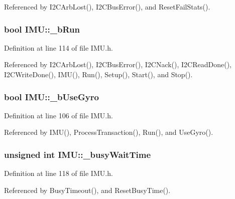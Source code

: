 Referenced by I2CArbLost(), I2CBusError(), and ResetFailStats().

\hypertarget{class_i_m_u_a547fe1fb8adb34917aa08663919b97df}{
\subsubsection[{\_\-bRun}]{\setlength{\rightskip}{0pt plus 5cm}bool {\bf IMU::\_\-bRun}}}
\label{class_i_m_u_a547fe1fb8adb34917aa08663919b97df}


Definition at line 114 of file IMU.h.



Referenced by I2CArbLost(), I2CBusError(), I2CNack(), I2CReadDone(), I2CWriteDone(), IMU(), Run(), Setup(), Start(), and Stop().

\hypertarget{class_i_m_u_a0cee90ebd5d0b57fa5ad3890c65108e2}{
\subsubsection[{\_\-bUseGyro}]{\setlength{\rightskip}{0pt plus 5cm}bool {\bf IMU::\_\-bUseGyro}}}
\label{class_i_m_u_a0cee90ebd5d0b57fa5ad3890c65108e2}


Definition at line 106 of file IMU.h.



Referenced by IMU(), ProcessTransaction(), Run(), and UseGyro().

\hypertarget{class_i_m_u_adce31ce2a3317918d73b47e94a2d9227}{
\subsubsection[{\_\-busyWaitTime}]{\setlength{\rightskip}{0pt plus 5cm}unsigned int {\bf IMU::\_\-busyWaitTime}}}
\label{class_i_m_u_adce31ce2a3317918d73b47e94a2d9227}


Definition at line 118 of file IMU.h.



Referenced by BusyTimeout(), and ResetBusyTime().

